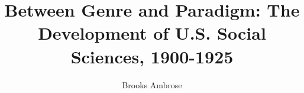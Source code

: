 
\title          {Between Genre and Paradigm: The Development of U.S. Social Sciences, 1900-1925}
\author         {Brooks Ambrose}




\dedication     {\textsl{Lorem ipsum.}
}




